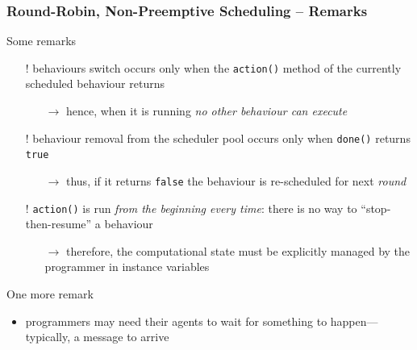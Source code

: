 \documentclass{beamer}\mode<presentation>{\usetheme{AMSCesenaPurpleAndGold}}
\begin{document}
\begin{frame}[c,allowframebreaks]\frametitle{Round-Robin, Non-Preemptive Scheduling -- Remarks}
    \begin{block}{Some remarks}
        \begin{itemize}
            \item[!] behaviours switch occurs only when the \texttt{action()} method of the currently scheduled behaviour returns
            \begin{itemize}
                \item[$\rightarrow$] hence, when it is running \emph{no other behaviour can execute}
            \end{itemize}
            \item[!] behaviour removal from the scheduler pool occurs only when \texttt{done()} returns \texttt{true}
            \begin{itemize}
                \item[$\rightarrow$] thus, if it returns \texttt{false} the behaviour is re-scheduled for next \emph{round}
            \end{itemize}
            \item[!] \texttt{action()} is run \emph{from the beginning every time}: there is no way to ``stop-then-resume'' a behaviour
            \begin{itemize}
                \item[$\rightarrow$] therefore, the computational state must be explicitly managed by the programmer in instance variables%
            \end{itemize}
        \end{itemize}
    \end{block}
    \begin{block}{One more remark}
        \begin{itemize}
            \item programmers may need their agents to wait for something to happen---typically, a message to arrive

\end{itemize}
\end{block}
\end{frame}
\end{document}
